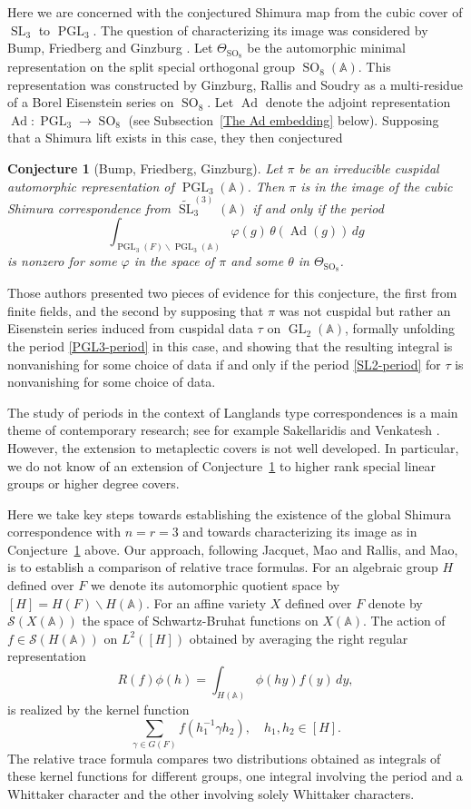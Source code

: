 \documentclass[12pt]{amsart}
\newcommand{\GL}{\operatorname{GL}}
\newcommand{\PGL}{\operatorname{PGL}}
\newcommand{\SL}{\operatorname{SL}}
\newcommand{\SO}{\operatorname{SO}}
\newcommand{\Ad}{\operatorname{Ad}}
\newcommand{\swrz}{\mathcal{S}}
\newcommand{\A}{\mathbb{A}}
\newcommand{\bs}{\backslash}
\newtheorem{conjecture}[theorem]{Conjecture}%
\theoremstyle{remark}
\begin{document}
Here we are concerned with the conjectured Shimura map from the cubic cover of $\SL_3$ to $\PGL_3$.  
The question of characterizing its image was considered by
 Bump, Friedberg and Ginzburg \cite{MR1882041}.   
 Let $\Theta_{\SO_8}$ be the 
 automorphic minimal representation on the split special orthogonal group $\SO_8(\A)$. This representation
was constructed by Ginzburg, Rallis and Soudry \cite{MR1469105} as a multi-residue of a Borel Eisenstein series on $\SO_8$.  Let $\Ad$ denote the adjoint representation
 $\Ad:\PGL_3\to \SO_8$ (see Subsection~\ref{The Ad embedding} below). 
 Supposing that a Shimura lift exists in this case, they then conjectured
 \begin{conjecture}[Bump, Friedberg, Ginzburg]\label{BFG-conjecture} Let $\pi$ be an irreducible cuspidal automorphic representation of $\PGL_3(\A)$.  Then $\pi$ is in the image of the cubic Shimura correspondence from 
 $\widetilde{\SL}_3^{(3)}(\A)$ if and only if the period
\begin{equation}\label{PGL3-period}
\int_{\PGL_3(F)\backslash \PGL_3(\A)} \varphi(g)\,\theta(\Ad(g))\,dg
\end{equation}
 is nonzero for some $\varphi$ in the space of $\pi$ and some $\theta$ in $\Theta_{\SO_8}$.
 \end{conjecture}
Those authors presented two pieces of evidence for this conjecture, the first from finite fields, and the second by supposing 
that $\pi$ was not cuspidal but rather an Eisenstein series induced from cuspidal data $\tau$ on $\GL_2(\A)$, formally unfolding
the period \eqref{PGL3-period} in this case, and showing that the resulting integral is nonvanishing for some choice of data if and only if the period \eqref{SL2-period} for $\tau$ is nonvanishing for some choice of data.  

The study of periods in the context of Langlands type correspondences is a main theme of contemporary research; see for example
Sakellaridis and Venkatesh \cite{MR3764130}.  However, the extension to metaplectic covers is not well developed.  In particular, 
we do not know of an 
 extension of Conjecture~\ref{BFG-conjecture} to higher rank special linear groups or higher degree covers.
 
 Here we take key steps towards establishing the existence of the global Shimura 
 correspondence with $n=r=3$ and towards characterizing its image as in Conjecture~\ref{BFG-conjecture} above.  
 Our approach, following Jacquet, Mao and Rallis, and Mao, is to establish 
a comparison of relative trace formulas.
For an algebraic group $H$ defined over $F$ we denote its automorphic quotient space by $[H]=H(F)\bs H(\A)$. 
For an affine variety $X$ defined over $F$ denote by $\swrz(X(\A))$ the space of Schwartz-Bruhat functions on $X(\A)$.
The action of $f\in \swrz(H(\A))$ on $L^2([H])$
obtained by averaging the right regular representation $$R(f)\phi(h)=\int_{H(\A)} \phi(hy) f(y)\,dy,$$ is realized by the kernel function
$$\sum_{\gamma\in G(F)} f(h_1^{-1}\gamma h_2),\quad h_1,h_2\in [H].$$
The relative trace formula compares two distributions obtained as 
integrals of these kernel functions for different groups, one integral involving the period and a Whittaker character and the other involving solely
Whittaker characters.
\end{document}
